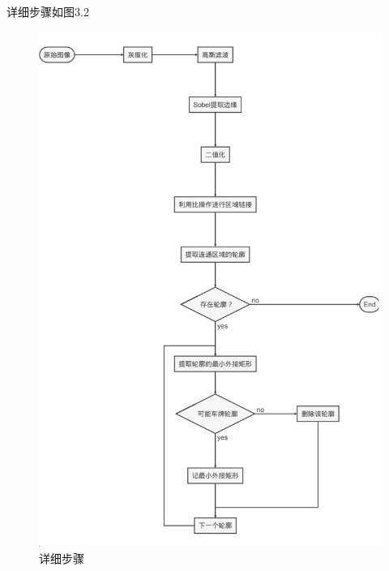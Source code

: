 详细步骤如图3.2
\begin{figure}[h]
	\centering
	\includegraphics[scale=0.5]{figures/6.png}
	\caption{详细步骤}
	\label{fig:2}
\end{figure}


